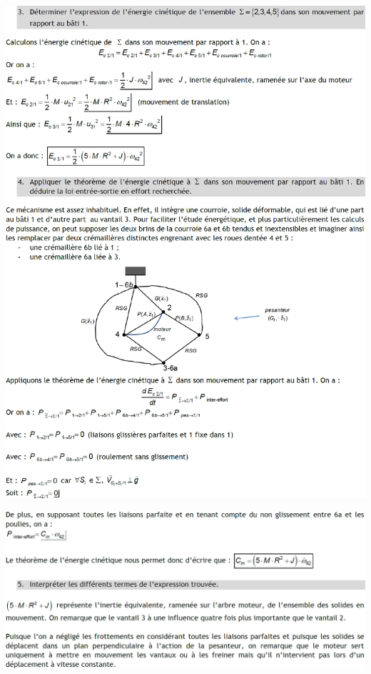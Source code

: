 \documentclass[10pt,fleqn]{article} %
\begin{document}
\begin{center}
\includegraphics[width=\linewidth]{images/cor_02.png}
\end{center}
\begin{center}
\includegraphics[width=\linewidth]{images/cor_03.png}
\end{center}
\end{document}
